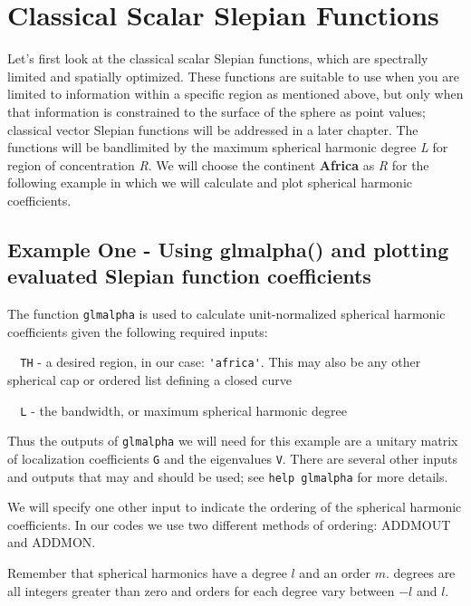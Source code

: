 \documentclass[11pt]{article}
\begin{document}
\section{Classical Scalar Slepian Functions}
%
Let's first look at the classical scalar Slepian functions, which are spectrally limited and spatially optimized. These functions are suitable to use when you are limited to information within a specific region as mentioned above, but only when that information is constrained to the surface of the sphere as point values; classical vector Slepian functions will be addressed in a later chapter. The functions will be bandlimited by the maximum spherical harmonic degree \textit{L} for region of concentration \textit{R}. We will choose the continent \textbf{Africa} as \textit{R} for the following example in which we will calculate and plot spherical harmonic coefficients. 

\subsection{Example One - Using glmalpha() and plotting evaluated Slepian function coefficients}

The function \verb+glmalpha+ is used to calculate unit-normalized spherical harmonic coefficients given the following required inputs:

\verb+	TH+ - a desired region, in our case: \verb+'africa'+. This may also be any other spherical cap or ordered list defining a closed curve

\verb+	L+ - the bandwidth, or maximum spherical harmonic degree

Thus the outputs of \verb+glmalpha+ we will need for this example are a unitary matrix of localization coefficients \verb+G+ and the eigenvalues \verb+V+. There are several other inputs and outputs that may and should be used; see \verb+help glmalpha+ for more details. 

We will specify one other input to indicate the ordering of the spherical harmonic coefficients. In our codes  we use two different methods of ordering: ADDMOUT and ADDMON. 

Remember that spherical harmonics have a degree $l$ and an order $m$. degrees are all integers greater than zero and orders for each degree vary between $-l$ and $l$.
\end{document}
